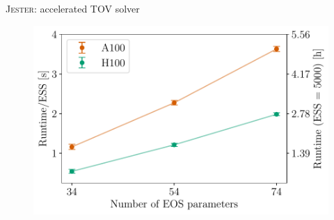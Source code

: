\documentclass[usenames,dvipsnames,t]{beamer}
\begin{document}
\begin{frame}{\textsc{Jester}: accelerated TOV solver}
  \vspace{\x}

  \begin{figure}
    \centering
    \includegraphics[width=0.60\linewidth]{Figures/scaling_plot.pdf}
  \end{figure}
\end{frame}







    
    
\end{document}
